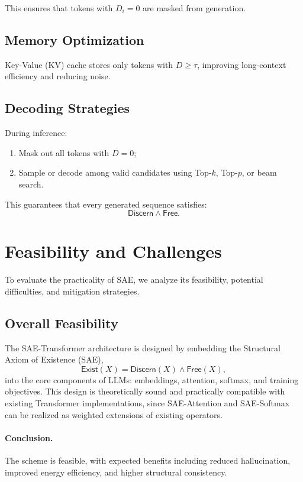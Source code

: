 \documentclass[11pt]{article}
\theoremstyle{plain}
\theoremstyle{definition}
\theoremstyle{remark}
\begin{document}
This ensures that tokens with $D_i=0$ are masked from generation.

\subsection{Memory Optimization}
Key-Value (KV) cache stores only tokens with $D \geq \tau$, improving long-context efficiency and reducing noise.

\subsection{Decoding Strategies}
During inference:
\begin{enumerate}
  \item Mask out all tokens with $D=0$;
  \item Sample or decode among valid candidates using Top-$k$, Top-$p$, or beam search.
\end{enumerate}

This guarantees that every generated sequence satisfies:
\[
\mathsf{Discern} \wedge \mathsf{Free}.
\]

\section{Feasibility and Challenges}

To evaluate the practicality of SAE, we analyze its feasibility, potential difficulties, and mitigation strategies.  

\subsection{Overall Feasibility}
The SAE-Transformer architecture is designed by embedding the Structural Axiom of Existence (SAE),
\[
  \mathsf{Exist}(X) = \mathsf{Discern}(X) \wedge \mathsf{Free}(X),
\]
into the core components of LLMs: embeddings, attention, softmax, and training objectives.
This design is theoretically sound and practically compatible with existing Transformer implementations,
since SAE-Attention and SAE-Softmax can be realized as weighted extensions of existing operators.

\paragraph{Conclusion.}  
The scheme is feasible, with expected benefits including reduced hallucination, improved energy efficiency,
and higher structural consistency.
\end{document}
